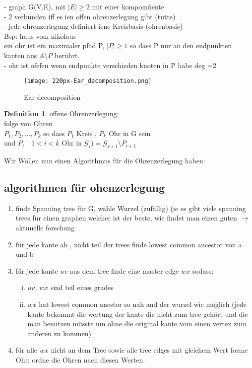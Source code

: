 \documentclass[a4paper]{article}
\theoremstyle{definition}
\newtheorem{definition}{Definition}
\theoremstyle{remark}
\begin{document}
- graph G(V,E), mit $|E|\geq 2$ mit einer kompomńente  \\
- 2 verbunden iff es ien offen ohrenzerlegung gibt (tutte)\\
- jede ohrenzerlegung definiert iene Kreisbasis (ohrenbasis)\\
Bsp: haus vom nikolaus\\
ein ohr ist ein maximaler pfad P, $|P|\geq 1$ so dass P nur an den endpunkten kanten aus $A\setminus P$ berührt.\\
-  ohr ist ofefen wenn endpunkte verschieden  knoten in P habe deg =2\\
\begin{figure}[ht]
  \centering
  \texttt{[image: 220px-Ear\_decomposition.png]}
  \caption{Ear decomposition}
  \label{fig:220px-Ear_decomposition}
\end{figure}
\begin{definition}
  offene Ohrenzerlegung:\\
  folge von Ohren \\
  $P_1,P_2,\dots,P_k$ so dass $P_1$ Kreis , $P_k$ Ohr in G sein\\
und $P_i \quad 1<i<k$ Ohr in $ \mathcal{G}_i)= \mathcal{G_{i+1}}\setminus P_{i+1}$ \\


\end{definition}
Wir Wollen nun einen Algorithmus für die Ohrenzerlegung haben:
\subsection{algorithmen für ohenzerlegung}
\label{sub:algorithmen_fur_ohenzerlegung}
\begin{enumerate}
  \item finde Spanning tree für G, wähle Wurzel (zufällig) (ie es gibt viele spanning trees für einen graphen welcher ist der beste, wie findet man einen guten $\rightarrow $ aktuuelle forschung
    \item für jede kante ab , nicht teil der trees finde lowest common ancestor von a und b
    \item für jede kante $uv$ aus dem tree finde eine master edge $wx$ sodass: \begin{enumerate}[(i)]
	\item $uv$, $wx$ sind teil eines grades
	\item $wx$ hat lowest common anestor so nah and der wurzel wie möglich
	  (jede kante bekommt die wertung der kante die nicht zum tree gehört und die man benutzen müsste um ohne die original kante vom einen vertex zum anderen zu kommen)

    \end{enumerate} 
  \item für alle $wx$ nicht an dem Tree sowie alle tree edges mit gleichem Wert forme Ohr; ordne die Ohren nach diesen Werten.
\end{enumerate}
\end{document}
